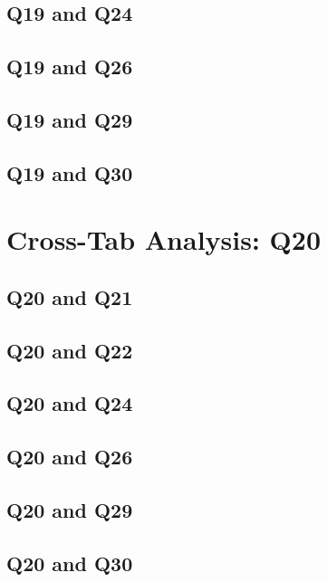 \documentclass{report}
\begin{document}
\clearpage
\section{Q19 and Q24}


\clearpage
\section{Q19 and Q26}


\clearpage
\section{Q19 and Q29}


\clearpage
\section{Q19 and Q30}


\chapter{Cross-Tab Analysis: Q20}
\section{Q20 and Q21}


\clearpage
\section{Q20 and Q22}


\clearpage
\section{Q20 and Q24}


\clearpage
\section{Q20 and Q26}


\clearpage
\section{Q20 and Q29}


\clearpage
\section{Q20 and Q30}

\end{document}
